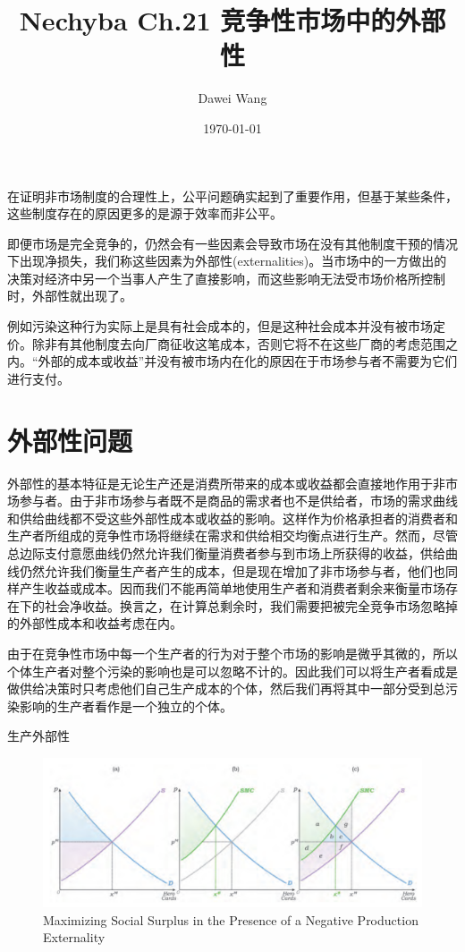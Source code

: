 \documentclass{article}
\title{Nechyba Ch.21 竞争性市场中的外部性}
\author{Dawei Wang}
\date{\today}
\begin{document}
	\maketitle
在证明非市场制度的合理性上，公平问题确实起到了重要作用，但基于某些条件，这些制度存在的原因更多的是源于效率而非公平。

即便市场是完全竞争的，仍然会有一些因素会导致市场在没有其他制度干预的情况下出现净损失，我们称这些因素为外部性(externalities)。当市场中的一方做出的决策对经济中另一个当事人产生了直接影响，而这些影响无法受市场价格所控制时，外部性就出现了。

例如污染这种行为实际上是具有社会成本的，但是这种社会成本并没有被市场定价。除非有其他制度去向厂商征收这笔成本，否则它将不在这些厂商的考虑范围之内。“外部的成本或收益”并没有被市场内在化的原因在于市场参与者不需要为它们进行支付。

\section{外部性问题}
外部性的基本特征是无论生产还是消费所带来的成本或收益都会直接地作用于非市场参与者。由于非市场参与者既不是商品的需求者也不是供给者，市场的需求曲线和供给曲线都不受这些外部性成本或收益的影响。这样作为价格承担者的消费者和生产者所组成的竞争性市场将继续在需求和供给相交均衡点进行生产。然而，尽管总边际支付意愿曲线仍然允许我们衡量消费者参与到市场上所获得的收益，供给曲线仍然允许我们衡量生产者产生的成本，但是现在增加了非市场参与者，他们也同样产生收益或成本。因而我们不能再简单地使用生产者和消费者剩余来衡量市场存在下的社会净收益。换言之，在计算总剩余时，我们需要把被完全竞争市场忽略掉的外部性成本和收益考虑在内。

由于在竞争性市场中每一个生产者的行为对于整个市场的影响是微乎其微的，所以个体生产者对整个污染的影响也是可以忽略不计的。因此我们可以将生产者看成是做供给决策时只考虑他们自己生产成本的个体，然后我们再将其中一部分受到总污染影响的生产者看作是一个独立的个体。

\hspace*{\fill}

生产外部性

\begin{figure}[H] %
	\centering %
	\includegraphics[width=1\textwidth]{21_1} %
	\caption{Maximizing Social Surplus in the Presence of a Negative Production Externality} %
	\label{Fig.main2} %
\end{figure}
\end{document}
